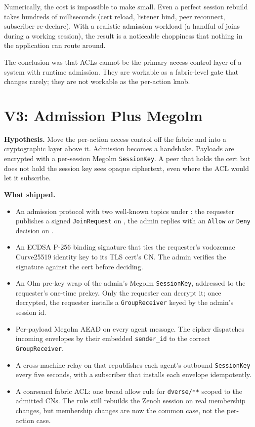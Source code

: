 \documentclass[11pt,a4paper]{article}
\begin{document}
Numerically, the cost is impossible to make small. Even a perfect
session rebuild takes hundreds of milliseconds (cert reload,
listener bind, peer reconnect, subscriber re-declare). With a
realistic admission workload (a handful of joins during a working
session), the result is a noticeable choppiness that nothing in
the application can route around.

The conclusion was that ACLs cannot be the primary access-control
layer of a system with runtime admission. They are workable as a
fabric-level gate that changes rarely; they are not workable as
the per-action knob.

\section{V3: Admission Plus Megolm}

\textbf{Hypothesis.} Move the per-action access control off the
fabric and into a cryptographic layer above it. Admission becomes
a handshake. Payloads are encrypted with a per-session Megolm
\texttt{SessionKey}. A peer that holds the cert but does not hold
the session key sees opaque ciphertext, even where the ACL would
let it subscribe.

\textbf{What shipped.}

\begin{itemize}[leftmargin=1.4em]
  \item An admission protocol with two well-known topics under
        : the requester publishes a signed
        \texttt{JoinRequest} on , the admin
        replies with an \texttt{Allow} or \texttt{Deny} decision
        on .
  \item An ECDSA P-256 binding signature that ties the
        requester's vodozemac Curve25519 identity key to its TLS
        cert's CN. The admin verifies the signature against the
        cert before deciding.
  \item An Olm pre-key wrap of the admin's Megolm
        \texttt{SessionKey}, addressed to the requester's
        one-time prekey. Only the requester can decrypt it; once
        decrypted, the requester installs a
        \texttt{GroupReceiver} keyed by the admin's session id.
  \item Per-payload Megolm AEAD on every agent message. The
        cipher dispatches incoming envelopes by their embedded
        \texttt{sender\_id} to the correct \texttt{GroupReceiver}.
  \item A cross-machine relay on
         that republishes each agent's
        outbound \texttt{SessionKey} every five seconds, with a
        subscriber that installs each envelope idempotently.
  \item A coarsened fabric ACL: one broad allow rule for
        \texttt{dverse/**} scoped to the admitted CNs. The rule
        still rebuilds the Zenoh session on real membership
        changes, but membership changes are now the common case,
        not the per-action case.
\end{itemize}
\end{document}
